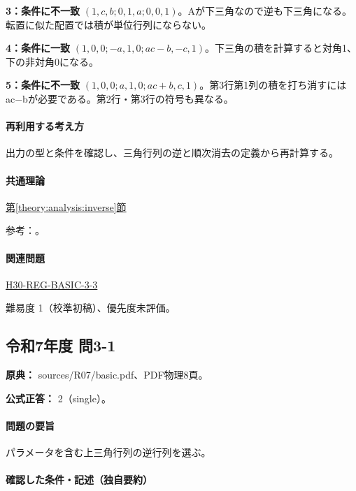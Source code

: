 \noindent\textbf{3：条件に不一致} \((1,c,b;0,1,a;0,0,1)\)。Aが下三角なので逆も下三角になる。転置に似た配置では積が単位行列にならない。\par

\noindent\textbf{4：条件に一致} \((1,0,0;-a,1,0;ac-b,-c,1)\)。下三角の積を計算すると対角1、下の非対角0になる。\par

\noindent\textbf{5：条件に不一致} \((1,0,0;a,1,0;ac+b,c,1)\)。第3行第1列の積を打ち消すにはac−bが必要である。第2行・第3行の符号も異なる。\par

\paragraph{再利用する考え方} 出力の型と条件を確認し、三角行列の逆と順次消去の定義から再計算する。

\paragraph{共通理論} \hyperref[theory:analysis:inverse]{第\ref*{theory:analysis:inverse}節}

\par 参考：\cite{mit_inverse2007}。

\paragraph{関連問題} \hyperref[q:h30-reg-basic-3-3]{H30-REG-BASIC-3-3}

\par 難易度 1（校準初稿）、優先度未評価。

\subsection{令和7年度 問3-1}
\label{q:r07-reg-basic-3-1}

\noindent\textbf{原典：} sources/R07/basic.pdf、PDF物理8頁。

\textbf{公式正答：} 2（single）。

\paragraph{問題の要旨} パラメータを含む上三角行列の逆行列を選ぶ。

\paragraph{確認した条件・記述（独自要約）}\mbox{}\par

